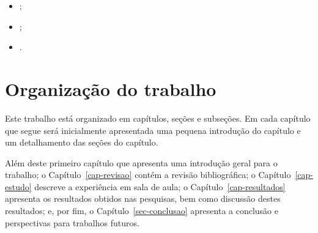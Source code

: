 \begin{itemize}
\item{;}
\item{;}
\item{.}
\end{itemize}

\section{Organização do trabalho}
Este trabalho está organizado em capítulos, seções e subseções.
Em cada capítulo que segue será inicialmente
apresentada uma pequena introdução do capítulo e um detalhamento
das seções do capítulo.

Além deste primeiro capítulo que apresenta uma introdução geral
para o trabalho;
o Capítulo~\ref{cap-revisao} contém a revisão bibliográfica;
o Capítulo~\ref{cap-estudo} descreve a experiência em sala de aula;
o Capítulo~\ref{cap-resultados} apresenta os resultados obtidos nas pesquisas, bem
como discussão destes resultados;
e, por fim, o Capítulo~\ref{sec-conclusao} apresenta a conclusão e perspectivas
para trabalhos futuros.
